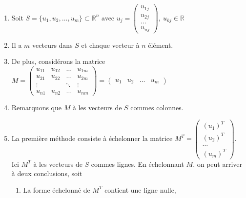 \begin{itemize}
\begin{itemize}
\begin{enumerate}[1), itemsep = 0.5em]
                        \item[] Soit $S = \{ u_1, u_2, \ldots, u_m \} \subset \mathbb{R}^n$ avec $u_j = \begin{pmatrix}
                                      u_{1j} \\
                                      u_{2j} \\
                                      \dots  \\
                                      u_{nj}
                                  \end{pmatrix}, \ u_{kj} \in \mathbb{R}$
                        \item[] Il a $m$ vecteurs dans $S$ et chaque vecteur à $n$ élément.
                        \item[] De plus, considérons la matrice $M = \begin{pmatrix}
                                      u_{11} & u_{12}      & \dots  & u_{1m} \\
                                      u_{21} & u_{22}      & \dots  & u_{2m} \\
                                      \vdots & \phantom{u} & \ddots & \vdots \\
                                      u_{n1} & u_{n2}      & \dots  & u_{nm}
                                  \end{pmatrix} = \begin{pmatrix}
                                      u_1 & u_2 & \ldots & u_m
                                  \end{pmatrix}$
                        \item[] Remarquons que $M$ à les vecteurs de $S$ commes colonnes.
                        \item La première méthode consiste à échelonner la matrice $M^T = \begin{pmatrix}
                                      (u_1)^T \\
                                      (u_2)^T \\
                                      \ldots  \\
                                      (u_m)^T
                                  \end{pmatrix}$. Ici $M^T$ à les vecteurs de $S$ commes lignes. En échelonnant
                              $M$, on peut arriver à deux conclusions, soit \begin{enumerate}[1.]
                                  \item La forme échelonné de $M^T$ contient une ligne nulle,

\end{enumerate}
\end{enumerate}
\end{itemize}
\end{itemize}
